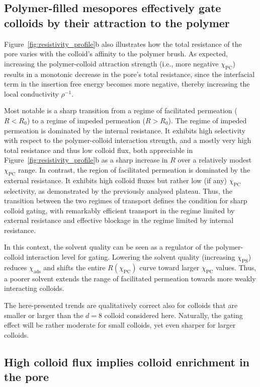 \documentclass[12pt, a4paper]{article}
\begin{document}
\subsection{Polymer-filled mesopores effectively gate colloids by their attraction to the polymer}

Figure~\ref{fig:resistivity_profile}b also illustrates how the total resistance of the pore varies with the colloid's affinity to the polymer brush.
As expected, increasing the polymer-colloid attraction strength (i.e., more negative $\chi_{\text{PC}}$) results in a monotonic decrease in the pore's total resistance, since the interfacial term in the insertion free energy becomes more negative, thereby increasing the local conductivity $\rho^{-1}$.

Most notable is a sharp transition from a regime of facilitated permeation ($R < R_0$) to a regime of impeded permeation ($R > R_0$).
The regime of impeded permeation is dominated by the internal resistance.
It exhibits high selectivity with respect to the polymer-colloid interaction strength, and a mostly very high total resistance and thus low colloid flux, both appreciable in Figure~\ref{fig:resistivity_profile}b as a sharp increase in $R$ over a relatively modest $\chi_{\text{PC}}$ range.
In contrast, the region of facilitated permeation is dominated by the external resistance. 
It exhibits high colloid fluxes but rather low (if any) $\chi_{\text{PC}}$ selectivity, as demonstrated by the previously analysed plateau.
Thus, the transition between the two regimes of transport defines the condition for sharp colloid gating, with remarkably efficient transport in the regime limited by external resistance and effective blockage in the regime limited by internal resistance.

In this context, the solvent quality can be seen as a regulator of the polymer-colloid interaction level for gating. 
Lowering the solvent quality (increasing $\chi_{\text{PS}}$) reduces $\chi_{\text{ads}}$ and shifts the entire $R(\chi_{\text{PC}})$ curve toward larger $\chi_{\text{PC}}$ values.
Thus, a poorer solvent extends the range of facilitated permeation towards more  weakly interacting colloids.

The here-presented trends are qualitatively correct also for colloids that are smaller or larger than the $d=8$ colloid considered here.
Naturally, the gating effect will be rather moderate for small colloids, yet even sharper for larger colloids.


\subsection{High colloid flux implies colloid enrichment in the pore}
\end{document}
